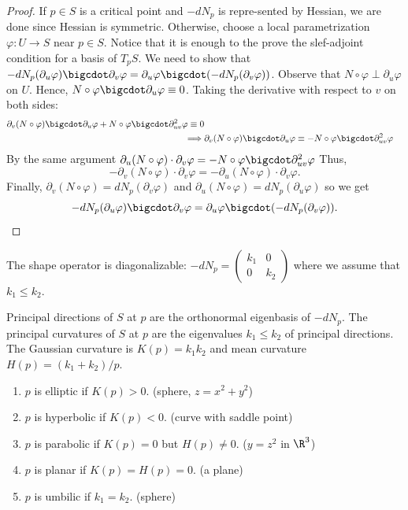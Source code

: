 \begin{proof}
     \td If $p \in S$ is a critical point and $-dN_p$ is repre-sented by Hessian, we are done since Hessian is symmetric. Otherwise, choose a local parametrization $\varphi : U \to S$ near $p \in S$. Notice that it is enough to the prove the slef-adjoint condition for a basis of $T_pS$. We need to show that $-dN_p(\partial_u \varphi)\bigcdot \partial_v \varphi = \partial_u \varphi \bigcdot (-dN_p(\partial_v \varphi))$. Observe that $N\circ \varphi \perp \partial_u \varphi$ on $U$. Hence, $N \circ \varphi \bigcdot \partial_u \varphi \equiv 0$. Taking the derivative with respect to $v$ on both sides:
    \begin{align*}
         \partial_v(N \circ \varphi)\bigcdot \partial_u \varphi + N\circ \varphi \bigcdot \partial_{uv}^2 \varphi \equiv 0\\
        \implies& \partial_v(N \circ \varphi)\bigcdot \partial_u \varphi \equiv - N\circ \varphi \bigcdot \partial_{uv}^2 \varphi
    \end{align*}
    By the same argument $\partial_u(N \circ \varphi)\cdot \partial_v \varphi = - N\circ \varphi \bigcdot \partial_{uv}^2\varphi$ Thus, 
    $$-\partial_v(N \circ \varphi)\cdot \partial_v \varphi = -\partial_u(N \circ \varphi)\cdot \partial_v \varphi.$$
    Finally, $\partial_v(N\circ \varphi) = dN_p(\partial_v \varphi)$ and $\partial_u(N\circ \varphi) = dN_p(\partial_u \varphi)$ so we get 
    $$-dN_p(\partial_u \varphi)\bigcdot \partial_v \varphi = \partial_u \varphi \bigcdot (-dN_p(\partial_v \varphi)).$$
    \td
\end{proof}

\begin{corollary}
    The shape operator is diagonalizable: $-dN_p = \begin{pmatrix}
        k_1 & 0 \\ 0 & k_2
    \end{pmatrix}$ where we assume that $k_1 \leq k_2$.
\end{corollary}

\begin{definition}
    Principal directions of $S$ at $p$ are the orthonormal eigenbasis of $-dN_p$. The principal curvatures of $S$ at $p$ are the eigenvalues $k_1 \leq k_2$ of principal directions. The Gaussian curvature is $K(p) = k_1k_2$ and mean curvature $H(p) = (k_1 + k_2)/p$. 
    \begin{enumerate}
        \item $p$ is elliptic if $K(p) > 0$. (sphere, $z = x^2 + y^2$)
        \item $p$ is hyperbolic if $K(p)< 0$. (curve with saddle point)
        \item $p$ is parabolic if $K(p) = 0$ but $H(p) \neq 0$. ($y = z^2$ in $\R^3$)
        \item $p$ is planar if $K(p) = H(p) = 0$. (a plane)
        \item $p$ is umbilic if $k_1 = k_2$. (sphere)
    \end{enumerate}
\end{definition}

